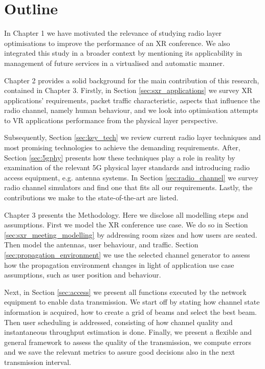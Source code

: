 \section{Outline}
\label{sec:outline}

In Chapter 1 we have motivated the relevance of studying radio layer optimisations to improve the performance of an \ac{XR} conference. We also integrated this study in a broader context by mentioning its applicability in management of future services in a virtualised and automatic manner. 

Chapter 2 provides a solid background for the main contribution of this research, contained in Chapter 3. Firstly, in Section \ref{sec:sxr_applications} we survey XR applications' requirements, packet traffic characteristic, aspects that influence the radio channel, namely human behaviour, and we look into optimisation attempts to VR applications performance from the physical layer perspective.

Subsequently, Section \ref{sec:key_tech} we review current radio layer techniques and most promising technologies to achieve the demanding requirements. After, Section \ref{sec:5gphy} presents how these techniques play a role in reality by examination of the relevant 5G physical layer standards and introducing radio access equipment, e.g. antenna systems. In Section \ref{sec:radio_channel} we survey radio channel simulators and find one that fits all our requirements. Lastly, the contributions we make to the state-of-the-art are listed.

Chapter 3 presents the Methodology. Here we disclose all modelling steps and assumptions. First we model the XR conference use case. We do so in Section \ref{sec:sxr_meeting_modelling} by addressing room sizes and how users are seated. Then model the antennas, user behaviour, and traffic. Section \ref{sec:propagation_environment} we use the selected channel generator to assess how the propagation environment changes in light of application use case assumptions, such as user position and behaviour.

Next, in Section \ref{sec:access} we present all functions executed by the network equipment to enable data transmission. We start off by stating how channel state information is acquired, how to create a grid of beams and select the best beam. Then user scheduling is addressed, consisting of how channel quality and instantaneous throughput estimation is done. Finally, we present a flexible and general framework to assess the quality of the transmission, we compute errors and we save the relevant metrics to assure good decisions also in the next transmission interval.

